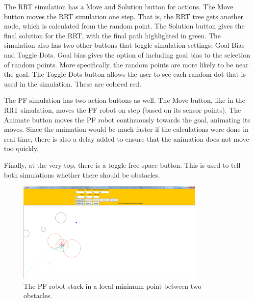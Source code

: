 \documentclass[12pt]{article}
\begin{document}
The RRT simulation has a Move and Solution button for actions. The Move button moves the RRT simulation one step. That is, the RRT tree gets another node, which is calculated from the random point. The Solution button gives the final solution for the RRT, with the final path highlighted in green. The simulation also has two other buttons that toggle simulation settings: Goal Bias and Toggle Dots. Goal bias gives the option of including goal bias to the selection of random points. More specifically, the random points are more likely to be near the goal. The Toggle Dots button allows the user to see each random dot that is used in the simulation. These are colored red. 

The PF simulation has two action buttons as well. The Move button, like in the RRT simulation, moves the PF robot on step (based on its sensor points). The Animate button moves the PF robot continuously towards the goal, animating its moves. Since the animation would be much faster if the calculations were done in real time, there is also a delay added to ensure that the animation does not move too quickly.

Finally, at the very top, there is a toggle free space button. This is used to tell both simulations whether there should be obstacles.


\begin{figure}
\centering
\includegraphics[width=350]{two_obstacles.png}
\caption{The PF robot stuck in a local minimum point between two obstacles.}
\end{figure}
\end{document}
